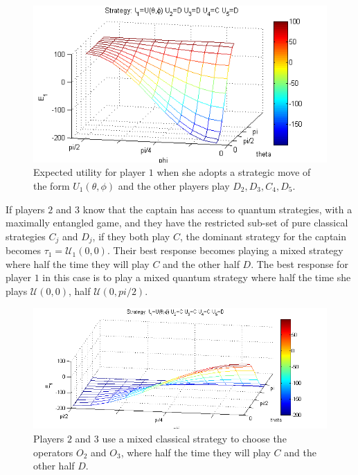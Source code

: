 \begin{figure}[h!]
\centering 
\includegraphics[scale=0.80]{Figures/1.5qubit/meanpirate.png}
\caption{Expected utility for player $1$ when she adopts a strategic move of the form $U_{1}(\theta,\phi)$ and the other players play $D_{2},D_{3},C_{4},D_{5}$. }
\label{fig:pg_3players_99_0_1:4}
\end{figure}

If players $2$ and $3$ know that the captain has access to quantum strategies, with a maximally entangled game, and they have the restricted sub-set of pure classical strategies $C_{j}$ and $D_{j}$, if they both play $C$, the dominant strategy for the captain becomes $\tau_{1} = \mathcal{U}_{1}(0,0)$. Their best response becomes playing a mixed strategy where half the time they will play $C$ and the other half $D$. The best response for player $1$ in this case is to play a mixed quantum strategy where half the time she plays $\mathcal{U}(0,0)$, half $\mathcal{U}(0,pi/2)$.



\begin{figure}[h!]
\centering 
\includegraphics[scale=0.80]{Figures/1.5qubit/meanpirategetscrewed.png}
\caption{Players $2$ and $3$ use a mixed classical strategy to choose the operators $O_{2}$ and $O_{3}$, where half the time they will play $C$ and the other half $D$. }
\label{fig:pg_3players_99_0_1:2}
\end{figure}


